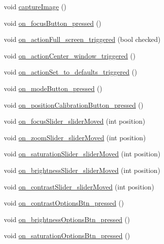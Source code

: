 \begin{DoxyCompactItemize}
\item 
void \mbox{\hyperlink{classMainWindow_a22df50c440a9aa974654f787d5935761}{capture\+Image}} ()
\item 
void \mbox{\hyperlink{classMainWindow_a5e9d6c6b9249ee3478427d2e33dfb901}{on\+\_\+focus\+Button\+\_\+pressed}} ()
\item 
void \mbox{\hyperlink{classMainWindow_ad210784d93519aa0e1664b943142ad97}{on\+\_\+action\+Full\+\_\+screen\+\_\+triggered}} (bool checked)
\item 
void \mbox{\hyperlink{classMainWindow_a6ced641b27821f153cd80aef4719fe41}{on\+\_\+action\+Center\+\_\+window\+\_\+triggered}} ()
\item 
void \mbox{\hyperlink{classMainWindow_a3292a73fad4dfd479598ea5166e293c9}{on\+\_\+action\+Set\+\_\+to\+\_\+defaults\+\_\+triggered}} ()
\item 
void \mbox{\hyperlink{classMainWindow_a295d30310cac58053dd2218f04a525c8}{on\+\_\+mode\+Button\+\_\+pressed}} ()
\item 
void \mbox{\hyperlink{classMainWindow_ad8b394c839532c8b74fb8c7602d3da89}{on\+\_\+position\+Calibration\+Button\+\_\+pressed}} ()
\item 
void \mbox{\hyperlink{classMainWindow_a4984f1218d13c28b7dd40f9e1cc9b9be}{on\+\_\+focus\+Slider\+\_\+slider\+Moved}} (int position)
\item 
void \mbox{\hyperlink{classMainWindow_a6ae3fbe8e4f3f10db4f2e0e495b98841}{on\+\_\+zoom\+Slider\+\_\+slider\+Moved}} (int position)
\item 
void \mbox{\hyperlink{classMainWindow_abd0b71ebb4667aa574bfa870ade22f58}{on\+\_\+saturation\+Slider\+\_\+slider\+Moved}} (int position)
\item 
void \mbox{\hyperlink{classMainWindow_aaaa1dd957c7f0cc75f5dec42ef429c81}{on\+\_\+brightness\+Slider\+\_\+slider\+Moved}} (int position)
\item 
void \mbox{\hyperlink{classMainWindow_ac9e59c581b41ab29cd61b41447cb74ef}{on\+\_\+contrast\+Slider\+\_\+slider\+Moved}} (int position)
\item 
void \mbox{\hyperlink{classMainWindow_a803bb81c63591b7f6c3306f712438378}{on\+\_\+contrast\+Options\+Btn\+\_\+pressed}} ()
\item 
void \mbox{\hyperlink{classMainWindow_a8b3a042f694a5013ad5e65253bc3a0ae}{on\+\_\+brightness\+Options\+Btn\+\_\+pressed}} ()
\item 
void \mbox{\hyperlink{classMainWindow_aa663ee1d7e10715e4998923eb87e5d15}{on\+\_\+saturation\+Options\+Btn\+\_\+pressed}} ()

\end{DoxyCompactItemize}
